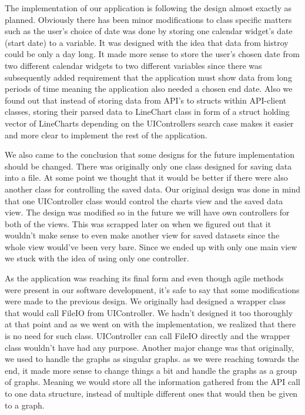 \documentclass{article}
\begin{document}
The implementation of our application is following the design almost exactly as planned. Obviously there has been minor modifications to class specific matters such as the user's choice of date was done by storing one calendar widget's date (start date) to a variable. It was designed with the idea that data from histroy could be only a day long. It made more sense to store the user's chosen date from two different calendar widgets to two different variables since there was subsequently added requirement that the application must show data from long periods of time meaning the application also needed a chosen end date. 
Also we found out that instead of storing data from API's to structs within API-client classes, storing their parsed data to LineChart class in form of a struct holding vector of LineCharts depending on the UIControllers search case makes it easier and more clear to implement the rest of the application. 

We also came to the conclusion that some designs for the future implementation should be changed. There was originally only one class designed for saving data into a file. At some point we thought that it would be better if there were also another class for controlling the saved data.
Our original design was done in mind that one UIController class would control the charts view and the saved data view. The design was modified so in the future we will have own controllers for both of the views. This was scrapped later on when we figured out that it wouldn't make sense to even make another view for saved datasets since the whole view would've been very bare. Since we ended up with only one main view we stuck with the idea of using only one controller.

As the application was reaching its final form and even though agile methods were present in our software development, it’s safe to say that some modifications were made to the previous design. We originally had designed a wrapper class that would call FileIO from UIController. We hadn’t designed it too thoroughly at that point and as we went on with the implementation, we realized that there is no need for such class. UIController can call FileIO directly and the wrapper class wouldn’t have had any purpose. 
Another major change was that originally, we used to handle the graphs as singular graphs. as we were reaching towards the end, it made more sense to change things a bit and handle the graphs as a group of graphs. Meaning we would store all the information gathered from the API call to one data structure, instead of multiple different ones that would then be given to a graph.
\end{document}
